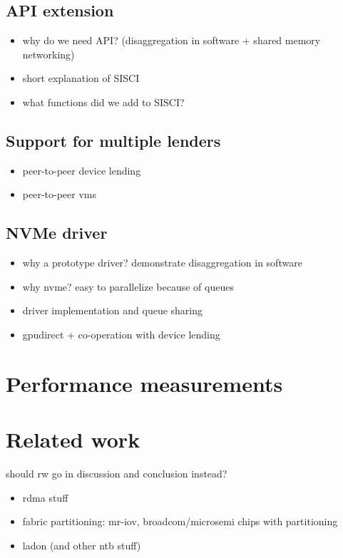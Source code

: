 \subsection{API extension}
\begin{itemize}
    \item why do we need API? (disaggregation in software + shared memory networking)
    \item short explanation of SISCI
    \item what functions did we add to SISCI?
\end{itemize}

\subsection{Support for multiple lenders}
\begin{itemize}
    \item peer-to-peer device lending
    \item peer-to-peer vms
\end{itemize}


\subsection{NVMe driver}\label{sec:nvme}
\begin{itemize}
    \item why a prototype driver? demonstrate disaggregation in software
    \item why nvme? easy to parallelize because of queues
    \item driver implementation and queue sharing
    \item gpudirect + co-operation with device lending
\end{itemize}


\section{Performance measurements}\label{sec:eval}

\section{Related work}\label{sec:rw}
should rw go in discussion and conclusion instead?
\begin{itemize}
    \item rdma stuff
    \item fabric partitioning: mr-iov, broadcom/microsemi chips with partitioning
    \item ladon (and other ntb stuff)
\end{itemize}

%
